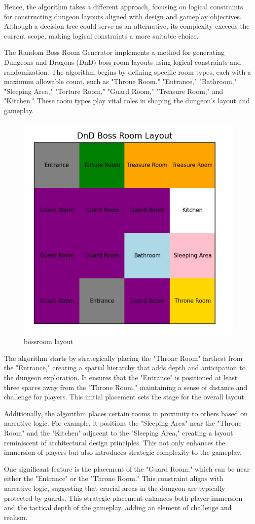 \documentclass[10pt,twocolumn]{article}
\begin{document}
Hence, the algorithm takes a different approach, focusing on logical constraints for constructing dungeon layouts aligned with design and gameplay objectives. Although a decision tree could serve as an alternative, its complexity exceeds the current scope, making logical constraints a more suitable choice.

The Random Boss Room Generator implements a method for generating Dungeons and Dragons (DnD) boss room layouts using logical constraints and randomization. The algorithm begins by defining specific room types, each with a maximum allowable count, such as "Throne Room," "Entrance," "Bathroom," "Sleeping Area," "Torture Room," "Guard Room," "Treasure Room," and "Kitchen." These room types play vital roles in shaping the dungeon's layout and gameplay.
\begin{figure}
    \centering
    \includegraphics[width=0.5\linewidth]{bossmap.png}
    \caption{bossroom layout}
    \label{fig:enter-label}
\end{figure}
The algorithm starts by strategically placing the "Throne Room" farthest from the "Entrance," creating a spatial hierarchy that adds depth and anticipation to the dungeon exploration. It ensures that the "Entrance" is positioned at least three spaces away from the "Throne Room," maintaining a sense of distance and challenge for players. This initial placement sets the stage for the overall layout.

Additionally, the algorithm places certain rooms in proximity to others based on narrative logic. For example, it positions the "Sleeping Area" near the "Throne Room" and the "Kitchen" adjacent to the "Sleeping Area," creating a layout reminiscent of architectural design principles. This not only enhances the immersion of players but also introduces strategic complexity to the gameplay.

One significant feature is the placement of the "Guard Room," which can be near either the "Entrance" or the "Throne Room." This constraint aligns with narrative logic, suggesting that crucial areas in the dungeon are typically protected by guards. This strategic placement enhances both player immersion and the tactical depth of the gameplay, adding an element of challenge and realism.
\end{document}
